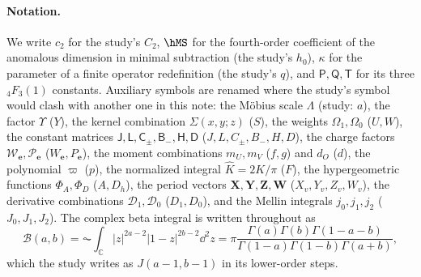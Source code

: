 \paragraph{Notation.} We write $c_2$ for the study's $C_2$, $\hMS$ for the fourth-order coefficient of the anomalous
dimension in minimal subtraction (the study's $h_0$), $\kappa$ for the parameter of a finite operator redefinition (the
study's $q$), and $\mathsf P,\mathsf Q,\mathsf T$ for its three ${}_4F_3(1)$ constants. Auxiliary symbols are
renamed where the study's symbol would clash with another one in this note: the M\"obius scale $\Lambda$ (study: $a$), the factor $\Upsilon$
($Y$), the kernel combination $\Sigma(x,y;z)$ ($S$), the weights $\Omega_1,\Omega_0$ ($U,W$), the constant matrices
$\mathsf J,\mathsf L,\mathsf C_\pm,\mathsf B_-,\mathsf H,\mathsf D$ ($J,L,C_\pm,B_-,H,D$), the charge factors
$\mathcal W_{\boldsymbol e},\mathcal P_{\boldsymbol e}$ ($W_{\boldsymbol e},P_{\boldsymbol e}$), the moment combinations
$m_U,m_V$ ($f,g$) and $d_O$ ($d$), the polynomial $\varpi$ ($p$), the normalized integral $\hat K=2K/\pi$ ($F$), the
hypergeometric functions $\Phi_A,\Phi_D$ ($A,D_h$), the period vectors $\mathbf X,\mathbf Y,\mathbf Z,\mathbf W$
($X_v,Y_v,Z_v,W_v$), the derivative combinations $\mathcal D_1,\mathcal D_0$ ($D_1,D_0$), and the Mellin integrals
$j_0,j_1,j_2$ ($J_0,J_1,J_2$). The complex beta integral is written throughout as
\begin{equation}
 \mathcal B(a,b)=\AC\!\int_{\mathbb C}|z|^{2a-2}|1-z|^{2b-2}\dd^2z
 =\pi\frac{\Gamma(a)\Gamma(b)\Gamma(1-a-b)}{\Gamma(1-a)\Gamma(1-b)\Gamma(a+b)},
 \label{sri:eq:cform:beta}
\end{equation}
which the study writes as $J(a-1,b-1)$ in its lower-order steps.

